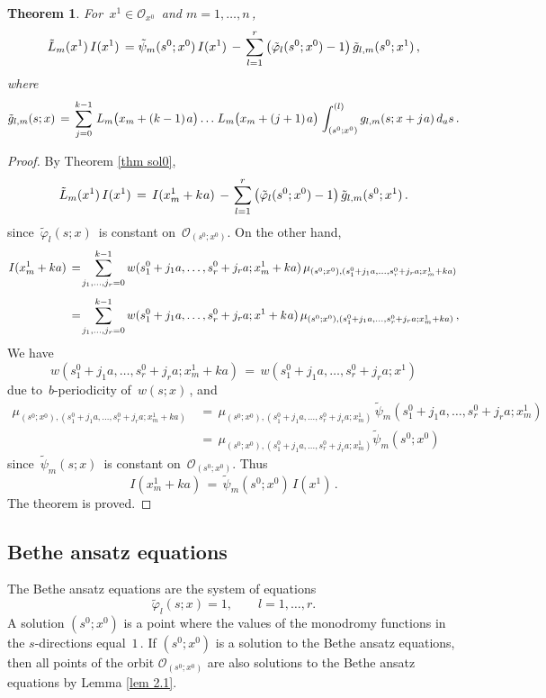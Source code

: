 \documentclass[12pt]{amsart}
\def\>{\relax\ifmmode\mskip.666667\thinmuskip\relax\else\kern.111111em\fi}
\def\<{\relax\ifmmode\mskip-.333333\thinmuskip\relax\else\kern-.0555556em\fi}
\newtheorem{thm}{Theorem}[section]
\theoremstyle{definition} %
\numberwithin{equation}{section}
\theoremstyle{definition}
\let\mc\mathcal
\let\phi\varphi
\def\beq{\begin{equation}}
\def\eeq{\end{equation}}
\def\be{\begin{equation*}}
\def\ee{\end{equation*}}
\begin{document}
\begin{thm}
\label{thm i sol0}
For \,$x^1\in \mc O_{x^0}$ \,and \;$m=1,\dots, n$\,,
\be
\tilde L_m(x^1)\,I(x^1)\,=\tilde\psi_m(s^0;x^0)\,I(x^1)\,-\>
\sum_{l=1}^r\,\bigl(\tilde\phi_l(s^0;x^0)-1\bigr)\,\tilde g_{l,m}(s^0;x^1)\,,
\ee
where
\beq
\label{glmt}
\tilde g_{l,m}(s;x)\,=\,\sum_{j=0}^{k-1}\,
L_m\bigl(x_m+(k-1)\>a\bigr)\dots\>L_m\bigl(x_m+(j+1)\>a\bigr)\>
\int^{(l)}_{(s^0; x^0)} g_{l,m}(s;x+j\<\>a)\,d_as\,.
\eeq
\end{thm}

\begin{proof}
By Theorem \ref{thm sol0},
\be
\tilde L_m(x^1)\,I(x^1)\,=\,I(x_m^1+k\<\>a)\,-\>
\sum_{l=1}^r\,\bigl(\tilde\phi_l(s^0;x^0)-1\bigr)\,\tilde g_{l,m}(s^0;x^1)\,.
\ee
since \,$\tilde \phi_l(s;x)$ \,is constant on \,$\mc O_{(s^0;x^0)}$.
On the other hand,
\begin{align*}
I(x^1_m+ ka)\,&{}=\!
\sum_{j_1, \dots, j_r=0}^{k-1} w(s_1^0+j_1a, \dots, s_r^0+j_ra; x^1_m+ka)
\,\mu_{(s^0; x^0),(s_1^0 + j_1a,\dots,s_r^0 + j_ra; x^1_m+ka)}
\\[4pt]
&{}=\!\sum_{j_1, \dots, j_r=0}^{k-1} w(s_1^0+j_1a, \dots, s_r^0+j_ra; x^1+k\<\>a)
\,\mu_{(s^0; x^0),(s_1^0 + j_1a,\dots,s_r^0 + j_ra; x^1_m+ka)}\,,
\end{align*}
We have
\be
w(s_1^0+j_1a, \dots, s_r^0+j_ra; x^1_m+ka)\,=\,
w(s_1^0+j_1a, \dots, s_r^0+j_ra; x^1)
\ee
due to \,$b$-periodicity  of \,$w(s;x)$\,, and
\begin{align*}
\mu_{(s^0; x^0),(s_1^0 + j_1a, \dots, s_r^0 + j_ra; x^1_m+ka)}\,&{}=\,
\mu_{(s^0; x^0),(s_1^0 + j_1a, \dots, s_r^0 + j_ra; x^1_m)}\,
\tilde \psi_m (s_1^0 + j_1a, \dots, s_r^0 + j_ra; x^1_m)
\\[3pt]
&{}=\,\mu_{(s^0; x^0),(s_1^0 + j_1a, \dots, s_r^0 + j_ra; x^1_m)}
\tilde \psi_m (s^0; x^0)
\end{align*}
since \,$\tilde \psi_m(s;x)$ \,is constant on \,$\mc O_{(s^0;x^0)}$. Thus
\be
I(x^1_m+ ka)\,=\,\tilde \psi_m (s^0; x^0)\,I(x^1)\,.
\ee
The theorem is proved.
\end{proof}

\subsection{Bethe ansatz equations}

The Bethe ansatz equations are the system of equations
\beq
\label{bae}
\tilde \phi_l(s;x) = 1, \qquad l=1,\dots,r.
\eeq
A solution $(s^0;x^0)$ is a point where the values of
the monodromy functions in the $s$-directions equal \,$1$\,.
If $(s^0; x^0)$ is a solution to the Bethe ansatz equations, then all points of
the orbit $\mc O_{(s^0;x^0)}$ are also solutions to the Bethe ansatz equations
by Lemma \ref{lem 2.1}.
\end{document}
